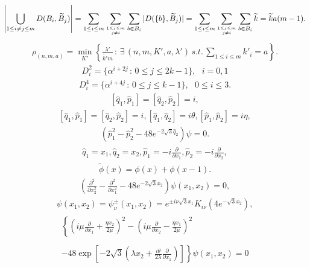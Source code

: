 \begin{align*}\left|\bigcup\limits_{1\leq i\ne j\leq m}D(B_i,\widetilde{B}_j)\right|=\sum\limits_{1\leq i\leq m}\sum\limits_{1\leq j\leq m\atop j\ne i}\sum_{b\in B_i}|D(\{b\},\widetilde{B}_j)|=\sum\limits_{1\leq i\leq m}\sum\limits_{1\leq j\leq m\atop j\ne i}\sum_{b\in B_i}\widetilde{k}=\widetilde{k}a(m-1).\end{align*}
\begin{align*}\rho_{(n,m,a)}=\min_{K'}\left\{\frac{\lambda'}{\widetilde{k'}m}\,:\,\exists\, (n,m,K',a,\lambda')\, s.t.\, \sum_{1\leq i\leq m}k'_i=a\right\}.\end{align*}
\begin{align*}D^{2}_i=\{\alpha^{i+2j}\,:\,0\leq j\leq 2k-1\},\,\,\,\,i=0,1\end{align*}
\begin{align*}D^{4}_i=\{\alpha^{i+4j}\,:\,0\leq j\leq k-1\},\,\,\,\,0\leq i\leq 3.\end{align*}
\begin{align*}\left[ \widehat{q}_1,\widehat{p}_1 \right]=\left[ \widehat{q}_2,\widehat{p}_2 \right]=i,\end{align*}
\begin{align*}\left[ \widehat{q}_1,\widehat{p}_1 \right]=\left[ \widehat{q}_2,\widehat{p}_2 \right]=i, \left[ \widehat{q}_1,\widehat{q}_2 \right]= i \theta, \left[ \widehat{p}_1,\widehat{p}_2 \right]= i \eta,\end{align*}
\begin{align*}\left(\widehat{p}_1^2-\widehat{p}_2^2 -48 e^{-2 \sqrt{3}\widehat{q}_2}\right) \psi=0.\end{align*}
\begin{align*}\widehat{q}_1=x_1, \widehat{q}_2=x_2 , \widehat{p}_1= -i \frac{\partial}{\partial x_1} , \widehat{p}_2= -i \frac{\partial}{\partial x_2},\end{align*}
\begin{align*}\widetilde{\phi} (x) = \phi (x) + \phi (x-1). \end{align*}
\begin{align*}\left(\frac{\partial^2}{\partial x_2^2} - \frac{\partial^2}{\partial x_1^2} -48 e^{-2 \sqrt{3} x_2} \right) \psi(x_1,x_2)=0,\end{align*}
\begin{align*}\psi(x_1,x_2) =\psi_{\nu}^{\pm} (x_1,x_2)=e^{\pm i \nu \sqrt{3}x_1}K_{i \nu}\left(4e^{- \sqrt{3}x_2}\right),\end{align*}
\begin{align*}\begin{array}{c}\left\{ \left(i \mu \frac{\partial}{\partial x_1} + \frac{\eta x_2}{2 \mu} \right)^2 -\left(i \mu \frac{\partial}{\partial x_2} - \frac{\eta x_1}{2 \mu} \right)^2\right.\\ \\ \left. -48 \exp \left[ -2 \sqrt{3} \left(\lambda x_2 + \frac{i \theta}{2 \lambda}\frac{\partial}{\partial x_1} \right) \right]\right\} \psi(x_1,x_2)=0\end{array}\end{align*}
